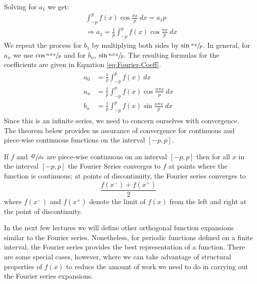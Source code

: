 Solving for $a_1$ we get:
\begin{align*}
&\int_{-p}^{p} f(x)\cos{\frac{\pi x}{p}} \ dx =a_1 p \\
& \Rightarrow a_1 = \frac{1}{p}\int_{-p}^{p} f(x)\cos{\frac{\pi x}{p}} \ dx
\end{align*}
We repeat the process for $b_1$ by multiplying both sides by $\sin{\sfrac{\pi x}{p}}$.  In general, for $a_n$ we use $\cos{\sfrac{n \pi x}{p}}$ and for $b_n$, $\sin{\sfrac{n \pi x}{p}}$.  The resulting formulas for the coefficients are given in Equation \ref{eq:Fourier-Coeff}.
\begin{align}
\begin{split}
a_0 &= \frac{1}{p}\int_{-p}^{p} f(x) \ dx \\
a_n &= \frac{1}{p}\int_{-p}^{p} f(x) \cos{\frac{n \pi x}{p}} \ dx \\
b_n &= \frac{1}{p}\int_{-p}^{p} f(x) \sin{\frac{n \pi x}{p}} \ dx 
\end{split}
\label{eq:Fourier-Coeff}
\end{align}
Since this is an infinite series, we need to concern ourselves with convergence.  The theorem below provides us assurance of convergence for continuous and piece-wise continuous functions on the interval $[-p,p]$.  
\vspace{4.0cm}

\begin{theorem}
If $f$ and $\sfrac{df}{dx}$ are piece-wise continuous on an interval $[-p,p]$ then for all $x$ in the interval $[-p,p]$ the Fourier Series converges to $f$ at points where the function is continuous; at points of discontinuity, the Fourier series converges to 
\begin{equation*}
\frac{f(x^{-}) + f(x^+)}{2}
\end{equation*}
where $f(x^-)$ and $f(x^+)$ denote the limit of $f(x)$ from the left and right at the point of discontinuity.
\end{theorem}
In the next few lectures we will define other orthogonal function expansions similar to the Fourier series.  Nonetheless, for periodic functions defined on a finite interval, the Fourier series provides the best representation of a function.  There are some special cases, however, where we can take advantage of structural properties of $f(x)$ to reduce the amount of work we need to do in carrying out the Fourier series expansions.

